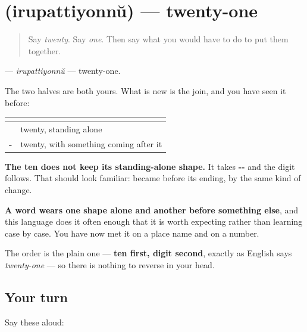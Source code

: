 \section[\texorpdfstring{\ml{ഇരുപത്തിയൊന്ന്} (irupattiyonnŭ)}{ഇരുപത്തിയൊന്ന് (irupattiyonnŭ)}]{ (irupattiyonnŭ) — twenty-one}

\label{lesson:ML-C88-compound-numbers}



\begin{quote}
Say \emph{twenty}. Say \emph{one}. Then say what you would have to do to put them together.
\end{quote}

\begin{grammarlens}[title={Grammar Lens: the ten changes shape before the digit}]
\textbf{} — \emph{irupattiyonnŭ} — twenty-one.

The two halves are both yours. What is new is the join, and you have seen it before:

\noindent
\begin{tabularx}{\linewidth}{@{}>{\raggedright\arraybackslash}X>{\raggedright\arraybackslash}X@{}}
\toprule
\textbf{} & \textbf{} \\
\midrule
\textbf{\ml{ഇരുപത്}} & twenty, standing alone \\
\textbf{\ml{ഇരുപത്തി}-} & twenty, with something coming after it \\
\bottomrule
\end{tabularx}

\textbf{The ten does not keep its standing-alone shape.} It takes \textbf{--} and the digit follows. That should look familiar: \textbf{} became \textbf{} before its ending, by the same kind of change.

\textbf{A word wears one shape alone and another before something else}, and this language does it often enough that it is worth expecting rather than learning case by case. You have now met it on a place name and on a number.

The order is the plain one — \textbf{ten first, digit second}, exactly as English says \emph{twenty-one} — so there is nothing to reverse in your head.
\end{grammarlens}

\subsection*{Your turn}
Say these aloud:

